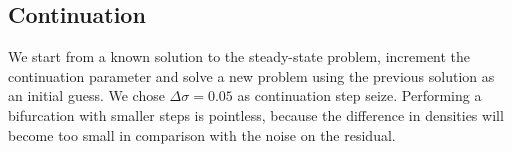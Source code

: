 


\subsection{Continuation}
 We start from a known solution to the steady-state problem, increment the continuation parameter and solve a new problem using the previous solution as an initial guess. We chose $\Delta \sigma = 0.05$ as continuation step seize. Performing a bifurcation with smaller steps is pointless, because the difference in densities will become too small in comparison with the noise on the residual.

